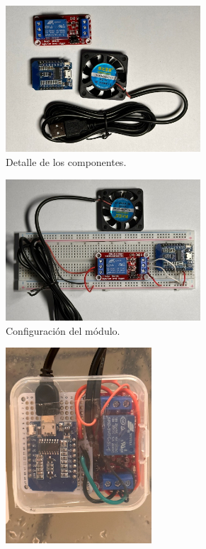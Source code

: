 \begin{figure}[!htpb]
     \centering
     \begin{subfigure}[b]{0.45\textwidth}
		\centering
		\includegraphics[width=0.80\textwidth]{./Figures/vent_control.jpg}
		\caption{Detalle de los componentes.}
		\label{fig:vent1}
     \end{subfigure}
     \hfill
     \begin{subfigure}[b]{0.45\textwidth}
	\centering
		\includegraphics[width=0.80\textwidth]{./Figures/vent_proto.jpg}
		\caption{Configuración del módulo.}
		\label{fig:vent2}
     \end{subfigure}	
	\begin{subfigure}[b]{0.45\textwidth}
		\centering
		\includegraphics[width=0.60\textwidth]{./Figures/vent_assembled.jpg}

\end{subfigure}
\end{figure}
